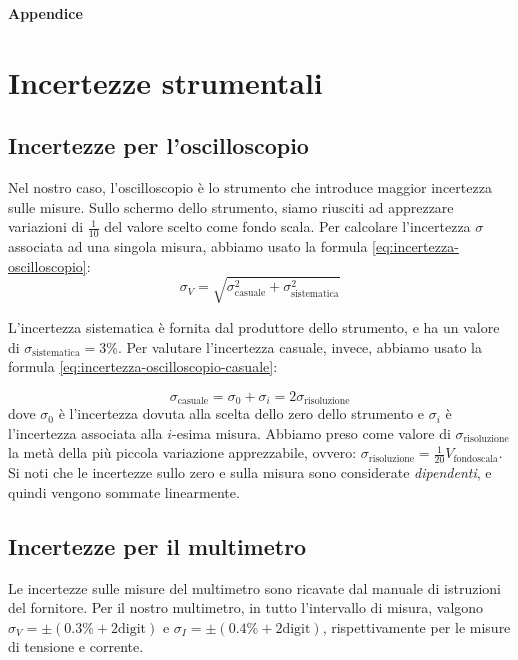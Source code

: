 \documentclass[11pt, a4paper, twoside]{article}
\begin{document}
\newpage
\appendix
\textbf{\huge{Appendice}}
\section{Incertezze strumentali}\label{sec:incertezze-strumentali}
  \subsection{Incertezze per l'oscilloscopio}\label{subsec:incertezze-oscilloscopio}
    Nel nostro caso, l'oscilloscopio è lo strumento che introduce maggior incertezza sulle misure. Sullo schermo dello strumento,
    siamo riusciti ad apprezzare variazioni di $\frac 1 {10}$ del valore scelto come fondo scala. Per calcolare l'incertezza $\sigma$ associata
    ad una singola misura, abbiamo usato la formula \eqref{eq:incertezza-oscilloscopio}:
    \begin{equation}
      \sigma_V = \sqrt{
        \sigma_\text{casuale}^2 + \sigma_\text{sistematica}^2
      }
      \label{eq:incertezza-oscilloscopio}
    \end{equation}

    L'incertezza sistematica è fornita dal produttore dello strumento, e ha un valore di $\sigma_\text{sistematica}=3\%$.
    Per valutare l'incertezza casuale, invece, abbiamo usato la formula \eqref{eq:incertezza-oscilloscopio-casuale}:

    \begin{equation}
      \sigma_\text{casuale} = \sigma_0 + \sigma_i = 2\sigma_\text{risoluzione}
      \label{eq:incertezza-oscilloscopio-casuale}
    \end{equation}
    dove $\sigma_0$ è l'incertezza dovuta alla scelta dello zero dello strumento e
    $\sigma_i$ è l'incertezza associata alla $i$-esima misura. Abbiamo preso come valore di $\sigma_\text{risoluzione}$ la metà
    della più piccola variazione apprezzabile, ovvero: $\sigma_\text{risoluzione} = \frac 1 {20} V_\text{fondoscala}$. Si noti che le
    incertezze sullo zero e sulla misura sono considerate \emph{dipendenti}, e quindi vengono sommate linearmente.

  \subsection{Incertezze per il multimetro}\label{subsec:incertezze-multimetro}
    Le incertezze sulle misure del multimetro sono ricavate dal manuale di istruzioni del fornitore. Per il nostro multimetro,
    in tutto l'intervallo di misura, valgono $\sigma_V = \pm (0.3\% + 2\text{digit})$ e $\sigma_I = \pm (0.4\% + 2\text{digit})$, rispettivamente per le misure di tensione e corrente.
\end{document}
